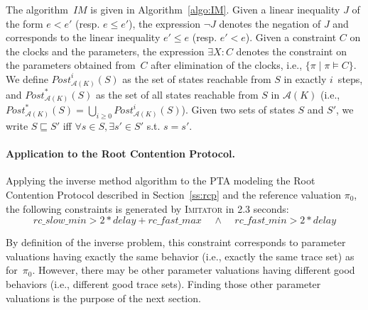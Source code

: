 \documentclass[a4paper,10pt]{article}
\newcommand{\A}{\mathcal{A}}
\newcommand{\rcpFMax}{\mathit{rc\_fast\_max}}
\newcommand{\rcpFMin}{\mathit{rc\_fast\_min}}
\newcommand{\rcpSMax}{\mathit{rc\_slow\_max}}
\newcommand{\rcpSMin}{\mathit{rc\_slow\_min}}
\newcommand{\rcpD}{\mathit{delay}}
\newcommand{\IM}{\mathit{IM}}
\newcommand{\imitator}{\textsc{Imitator}}
\newcommand{\paragraphe}[1]{\paragraph{#1.}}
\begin{document}
The algorithm~$\IM$ is given in Algorithm~\ref{algo:IM}.
Given a linear inequality $J$ of the form $e < e'$ (resp. $e \leq e'$), the expression $\neg J$ denotes the negation of $J$ and corresponds to the linear inequality $e' \leq e$ (resp. $e' < e$).
% 
Given a constraint $C$ on the clocks and the parameters, the expression $\exists X: C$ denotes the constraint on the parameters obtained from~$C$ after elimination of the clocks, i.e., $\{ \pi \mid \pi \models C\}$.
% 
We define $\mathit{Post}_{\A(K)}^i(S)$ as the set of states reachable from $S$ in exactly $i$~steps,
and $\mathit{Post}_{\A(K)}^*(S)$ as the set of all states reachable from $S$ in $\A(K)$
(i.e., $\mathit{Post}_{\A(K)}^*(S)=\bigcup_{i\geq 0 }\mathit{Post}_{\A(K)}^i(S)$).
Given two sets of states $S$ and $S'$, we write $S \sqsubseteq S' $ iff
$\forall s \in S , \exists s' \in S' $ s.t. $s = s'$.


\paragraphe{Application to the Root Contention Protocol}
Applying the inverse method algorithm to the PTA modeling the Root Contention Protocol described in Section~\ref{ss:rcp} and the reference valuation $\pi_0$, the following constraints is generated
by \imitator{}
in 2.3 seconds: %
$$ \rcpSMin > 2 * \rcpD + \rcpFMax
\ \ \ \ \ 
 \land \ \ \ \ \ \rcpFMin > 2 * \rcpD$$


By definition of the inverse problem, this constraint corresponds to parameter valuations having exactly the same behavior (i.e., exactly the same trace set) as for~$\pi_0$.
However, there may be other parameter valuations having different good behaviors (i.e., different good trace sets). %
Finding those other parameter valuations is the purpose of the next section.
\end{document}
